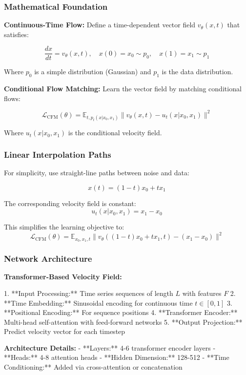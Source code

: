 \documentclass[a4paper,12pt]{article}
\begin{document}
\subsubsection{Mathematical Foundation}

\textbf{Continuous-Time Flow:} Define a time-dependent vector field $v_\theta(x, t)$ that satisfies:

\[ \frac{dx}{dt} = v_\theta(x, t), \quad x(0) = x_0 \sim p_0, \quad x(1) = x_1 \sim p_1 \]

Where $p_0$ is a simple distribution (Gaussian) and $p_1$ is the data distribution.

\textbf{Conditional Flow Matching:} Learn the vector field by matching conditional flows:

\[ \mathcal{L}_\text{CFM}(\theta) = \mathbb{E}_{t, p_t(x|x_0,x_1)} \| v_\theta(x, t) - u_t(x|x_0,x_1) \|^2 \]

Where $u_t(x|x_0,x_1)$ is the conditional velocity field.

\subsubsection{Linear Interpolation Paths}

For simplicity, use straight-line paths between noise and data:

\[ x(t) = (1-t) x_0 + t x_1 \]

The corresponding velocity field is constant:
\[ u_t(x|x_0,x_1) = x_1 - x_0 \]

This simplifies the learning objective to:
\[ \mathcal{L}_\text{CFM}(\theta) = \mathbb{E}_{x_0,x_1,t} \| v_\theta((1-t)x_0 + t x_1, t) - (x_1 - x_0) \|^2 \]

\subsubsection{Network Architecture}

\textbf{Transformer-Based Velocity Field:}

1. **Input Processing:** Time series sequences of length $L$ with features $F$
2. **Time Embedding:** Sinusoidal encoding for continuous time $t \in [0,1]$
3. **Positional Encoding:** For sequence positions
4. **Transformer Encoder:** Multi-head self-attention with feed-forward networks
5. **Output Projection:** Predict velocity vector for each timestep

\textbf{Architecture Details:}
- **Layers:** 4-6 transformer encoder layers
- **Heads:** 4-8 attention heads
- **Hidden Dimension:** 128-512
- **Time Conditioning:** Added via cross-attention or concatenation
\end{document}
